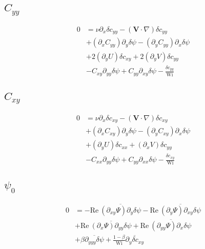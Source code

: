 \documentclass[12,a4paper]{article}
\newcommand{\dd}[1]{\partial_{#1}}
\newcommand{\scxx}{\delta c_{xx}}
\newcommand{\scyy}{\delta c_{yy}}
\newcommand{\scxy}{\delta c_{xy}}
\newcommand{\spsi}{\delta \psi}
\newcommand{\Wi}{\mathrm{Wi}}
\newcommand{\Rey}{\mathrm{Re \ }}
\begin{document}
\subsection{$C_{yy}$}

\begin{align}
    0 &= \nu \dd{x} \scyy - (\mathbf{V}\cdot \nabla) \scyy \nonumber \\
    &+ (\dd{x}C_{yy})\dd{y}\spsi - (\dd{y}C_{yy})\dd{x} \spsi \nonumber\\
    &+ 2(\dd{y}U)\scxy + 2(\dd{y}V)\scyy \nonumber \\
    &- C_{xy}\dd{yy}\spsi + C_{yy}\dd{xy} \spsi - \frac{\scyy}{\Wi} 
\end{align}

\subsection{$C_{xy}$}

\begin{align}
    0 &= \nu \dd{x} \scxy - (\mathbf{V}\cdot \nabla) \scxy \nonumber \\
    &+ (\dd{x}C_{xy})\dd{y}\spsi - (\dd{y}C_{xy})\dd{x} \spsi \nonumber\\
    &+ (\dd{y}U) \scxx + (\dd{x}V) \scyy \nonumber \\
    &- C_{xx}\dd{yy} \spsi + C_{yy} \dd{xx} \spsi - \frac{\scxy}{\Wi}
\end{align}

\subsection{$\psi_{0}$}

\begin{align}
    0 &= - \Rey\overline{(\dd{xy}\Psi) \dd{y}\spsi}  - \Rey\overline{(\dd{y}\Psi)\dd{xy}\spsi} \nonumber \\
    &+ \Rey\overline{(\dd{x}\Psi) \dd{yy}\spsi} + \Rey\overline{(\dd{yy}\Psi) \dd{x}\spsi } \nonumber \\
    &+ \beta \overline{\dd{yyy}\spsi} + \frac{1-\beta}{\Wi} \overline{\dd{y}\scxy}
\end{align}
\end{document}
